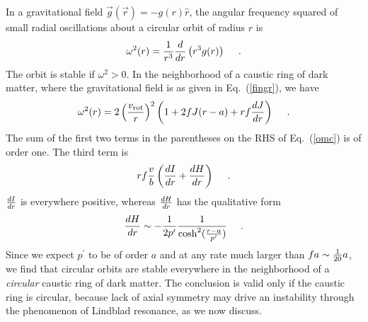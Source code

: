 \documentclass[aps,prd,preprint,tightenlines,floatfix,showpacs,groupedaddress]{revtex4}
\begin{document}
{In a gravitational field $\vec{g}(\vec{r}) = - g(r) \hat{r}$, 
the angular frequency squared of small radial oscillations about 
a circular orbit of radius $r$ is 
\begin{equation}
\omega^2(r) = {1 \over r^3} {d \over dr} \left(r^3 g(r)\right)~~~\ .
\label{genom}
\end{equation}
The orbit is stable if $\omega^2 > 0$.  In the neighborhood of 
a caustic ring of dark matter, where the gravitational field is 
as given in Eq.~(\ref{fingr}), we have 
\begin{equation}
\omega^2(r) = 2 \left({v_{\rm rot} \over r}\right)^2
\left(1 + 2 f J(r-a) + r f {d J \over dr}\right)~~~\ .
\label{omc}
\end{equation}
The sum of the first two terms in the parentheses on the RHS of
Eq.~(\ref{omc}) is of order one.  The third term is
\begin{equation}
r f {v \over b} \left({d I \over dr} + {d H \over dr} \right)~~~\ .
\label{3dterm}
\end{equation}
${d I \over dr}$ is everywhere positive, whereas ${d H \over dr}$ 
has the qualitative form 
\begin{equation}
{d H \over dr} \sim - {1 \over 2 p^\prime}
{1 \over \cosh^2 ({r-a \over p^\prime})}~~~\ .
\label{dHdr}
\end{equation}
Since we expect $p^\prime$ to be of order $a$ and at any 
rate much larger than $f a \sim {1 \over 20} a$, we find 
that circular orbits are stable everywhere in the neighborhood 
of a {\it circular} caustic ring of dark matter.  The conclusion 
is valid only if the caustic ring is circular, because lack of 
axial symmetry may drive an instability through the phenomenon 
of Lindblad resonance, as we now discuss.

}
\end{document}
